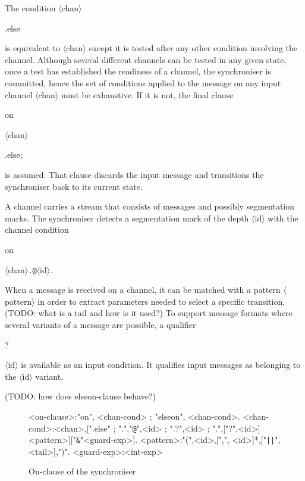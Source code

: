 The condition $\langle$chan$\rangle$\begin{bf}.else\end{bf} is equivalent to $\langle$chan$\rangle$ except it is tested after any other condition involving the channel. Although several different channels can be tested in any given state, once a test has established the readiness of a channel, the synchroniser is committed, hence the set of conditions applied to the message on any input channel $\langle$chan$\rangle$ must be exhaustive. If it is not, the final clause \begin{bf}on\end{bf} $\langle$chan$\rangle$\begin{bf}.else;\end{bf} is assumed. That clause discards the input message and transitions the synchroniser back to its current state.

A channel carries a stream that consists of messages and possibly segmentation marks. The synchroniser detects a segmentation mark of the depth $\langle$id$\rangle$ with the channel condition \begin{bf}on\end{bf} $\langle$chan$\rangle${\tt .@}$\langle$id$\rangle$. 

When a message is received on a channel, it can be matched with a pattern $\langle$pattern$\rangle$ in order to extract parameters needed to select a specific transition. (TODO: what is a tail and how is it used?) To support message formats where several variants of a message are possible, a qualifier \begin{bf}?\end{bf}$\langle$id$\rangle$ is available as an input condition. It qualifies input messages as belonging to the $\langle$id$\rangle$ variant.

(TODO: how does elseon-clause behave?)

\begin{figure}[h!]
\small
\begin{grammar}
<on-clause>:"on", <chan-cond> ; "elseon", <chan-cond>.
<chan-cond>:<chan>,[".else" ; ".","{\tt @}",<id> ; ".?",<id> ; ".",["?",<id>]<pattern>]["{\tt \&}"<guard-exp>].
<pattern>:"(",<id>,[",", <id>]*,["{\tt ||}",<tail>],")".
<guard-exp>:<int-exp>
\end{grammar}
\caption{On-clause of the synchroniser}
\label{sync_syntax:on}
\end{figure}

